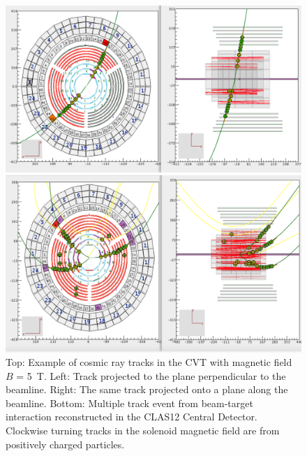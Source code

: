 \documentclass[final,3p,twocolumn]{elsarticle}
\begin{document}
\begin{figure}[th!]
\centerline{\includegraphics[width=1.0\columnwidth]{cvt-cosmic-w-solenoid.png}}
\centerline{\includegraphics[width=1.0\columnwidth]{cvt-3-tracks.png}}
\caption{Top: Example of cosmic ray tracks in the CVT with magnetic field $B$ = 5~T. Left: Track projected to
the plane perpendicular to the beamline. Right: The same track projected onto a plane along the beamline. Bottom:
Multiple track event from beam-target interaction reconstructed in the CLAS12 Central Detector. 
Clockwise turning tracks in the solenoid magnetic field are from positively charged particles.}
\label{cvt-tracks}
\end{figure}
\end{document}
